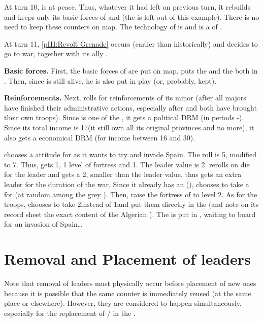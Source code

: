 \begin{exemple}
  At turn 10, \paysAlgerie is at peace. Thus, whatever it had left on previous
  turn, it rebuilds and keeps only its basic forces of \ARMY\facemoins and
  \FLEET\facemoins (the \corsaire is left out of this example). There is no
  need to keep these counters on map. The technology of \paysAlgerie is \TREN
  and \paysAlgerie is a \VASSAL of \TUR.

  At turn 11, \ref{pIII:Revolt Grenade} occurs (earlier than historically) and
  \TUR decides to go to war, together with its ally \paysAlgerie.

  \textbf{Basic forces.} First, the basic forces of \paysAlgerie are put on
  map. \TUR puts the \ARMY\facemoins and the \FLEET\facemoins both in
  \provinceAlgerie. Then, since  is still alive, he is also
  put in play (or, probably, kept).

  \textbf{Reinforcements.} Next, \TUR rolls for reinforcements of its minor
  (after all majors have finished their administrative actions, especially
  after \TUR and \HIS both have brought their own troops). Since \paysAlgerie
  is one of the \Barbaresques, it gets a  political DRM (in periods
  -). Since its total income is 17\ducats (it still own
  all its original provinces and no more), it also gets a 
  economical DRM (for income between 16 and 30\ducats).

  \TUR chooses a  attitude for \paysAlgerie as it wants to try
  and invade Spain. The roll is 5, modified to 7. Thus, \paysAlgerie gets
  1\LD, 1 level of fortress and 1\ND. The leader value is 2. \TUR rerolls on
  die for the leader and gets a 2, smaller than the leader value, thus
  \paysAlgerie gets an extra leader for the duration of the war. Since it
  already has an \LeaderA (), \TUR chooses to take a
  \LeaderG for \paysAlgerie (at random among the grey \anonyme\LeaderG). Then,
  \TUR raise the fortress of \provinceAlgerie to level 2. As for the troops,
  \TUR chooses to take 2\NGD instead of 1\ND and put them directly in the
  \FLEET (and note on its record sheet the exact content of the Algerian
  \FLEET). The \LD is put in \provinceAlgerie, waiting to board for an
  invasion of Spain\ldots
\end{exemple}

\section{Removal and Placement of leaders}
\label{chLogistic:Leaders}
\begin{designnote}
  Note that removal of leaders must physically occur before placement of new
  ones because it is possible that the same \anonyme counter is immediately
  reused (at the same place or elsewhere). However, they are considered to
  happen simultaneously, especially for the replacement of \LeaderC/\LeaderE
  in the \ROTW.
\end{designnote}

